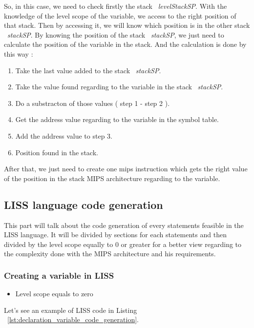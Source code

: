\documentclass[
  oneside,
  11pt, a4paper,
  footinclude=true,
  headinclude=true,
  cleardoublepage=empty
]{scrbook}
\begin{document}
So, in this case, we need to check firstly the stack ~\textit{levelStackSP}. With the knowledge of the level scope of the variable, we access to the right position of that stack. Then by accessing it, we will know which position is in the other stack ~\textit{stackSP}.
By knowing the position of the stack ~\textit{stackSP}, we just need to calculate the position of the variable in the stack.
And the calculation is done by this way :

\begin{enumerate}
\item Take the last value added to the stack ~\textit{stackSP}.
\item Take the value found regarding to the variable in the stack ~\textit{stackSP}.
\item Do a substracton of those values ( step 1 - step 2 ).
\item Get the address value regarding to the variable in the symbol table.
\item Add the address value to step 3.
\item Position found in the stack.
\end{enumerate}

After that, we just need to create one mips instruction which gets the right value of the position in the stack MIPS architecture regarding to the variable.

\subsection{LISS language code generation}

This part will talk about the code generation of every statements feasible in the LISS language.
It will be divided by sections for each statements and then divided by the level scope equally to 0 or greater for a better view regarding to the complexity done with the MIPS architecture and his requirements.

\subsubsection{Creating a variable in LISS}

\begin{itemize}
\item Level scope equals to zero
\end{itemize}

Let's see an example of LISS code in Listing ~\ref{lst:declaration_variable_code_generation}.
\end{document}
